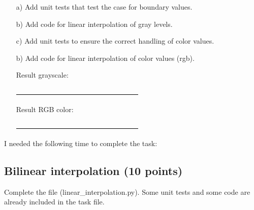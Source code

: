 \begin{enumerate}

\item[a)] Add unit tests that test the case for boundary values. 

\item[b)] Add code for linear interpolation of gray levels. 

\item[c)] Add unit tests to ensure the correct handling of color values. 

\item[b)] Add code for linear interpolation of color values (rgb). 

Result grayscale:

\includegraphics[width=0.5\textwidth]{source_code/interpolate_grayscale.png}

Result RGB color:

\includegraphics[width=0.5\textwidth]{source_code/interpolate_rgb.png}

\end{enumerate}

I needed the following time to complete the task:

\subsection{Bilinear interpolation (10 points)}

Complete the file (linear\_interpolation.py). Some unit tests and some code are already included in the task file.

